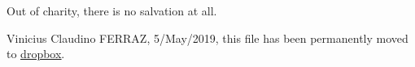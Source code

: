 \documentclass[11pt,a4paper]{article}
\begin{document}
Out of charity, there is no salvation at all.

\vspace{3mm}

Vinicius Claudino FERRAZ, 5/May/2019, this file has been permanently moved to \href{https://www.dropbox.com/s/dnrsfifbqzrejkm/trissection.pdf?dl=0}{\color{blue}\underline{dropbox}}.
\end{document}
